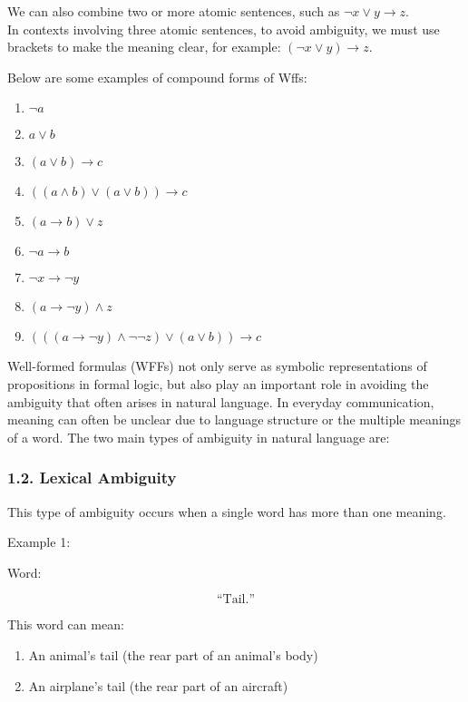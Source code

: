 We can also combine two or more atomic sentences, such as
\(\lnot x \lor y \rightarrow z\).\\
In contexts involving three atomic sentences, to avoid ambiguity, we
must use brackets to make the meaning clear, for example:
\((\lnot x \lor y) \rightarrow z\).

Below are some examples of compound forms of Wffs:

\begin{enumerate}
\def\labelenumi{\arabic{enumi}.}
\tightlist
\item
  \(\lnot a\)
\item
  \(a \lor b\)
\item
  \((a \lor b) \rightarrow c\)
\item
  \(((a \land b) \lor (a \lor b)) \rightarrow c\)
\item
  \((a \rightarrow b) \lor z\)
\item
  \(\lnot a \rightarrow b\)
\item
  \(\lnot x \rightarrow \lnot y\)
\item
  \((a \rightarrow \lnot y) \land z\)
\item
  \((((a \rightarrow \lnot y) \land \lnot\lnot z) \lor (a \lor b)) \rightarrow c\)
\end{enumerate}

Well-formed formulas (WFFs) not only serve as symbolic representations
of propositions in formal logic, but also play an important role in
avoiding the ambiguity that often arises in natural language. In
everyday communication, meaning can often be unclear due to language
structure or the multiple meanings of a word. The two main types of
ambiguity in natural language are:

\subsubsection{1.2. Lexical Ambiguity}\label{lexical-ambiguity}

This type of ambiguity occurs when a single word has more than one
meaning.

Example 1:

Word:

\[\text{“Tail.”}\]

This word can mean:

\begin{enumerate}
\def\labelenumi{\arabic{enumi}.}
\tightlist
\item
  An animal's tail (the rear part of an animal's body)
\item
  An airplane's tail (the rear part of an aircraft)
\end{enumerate}

